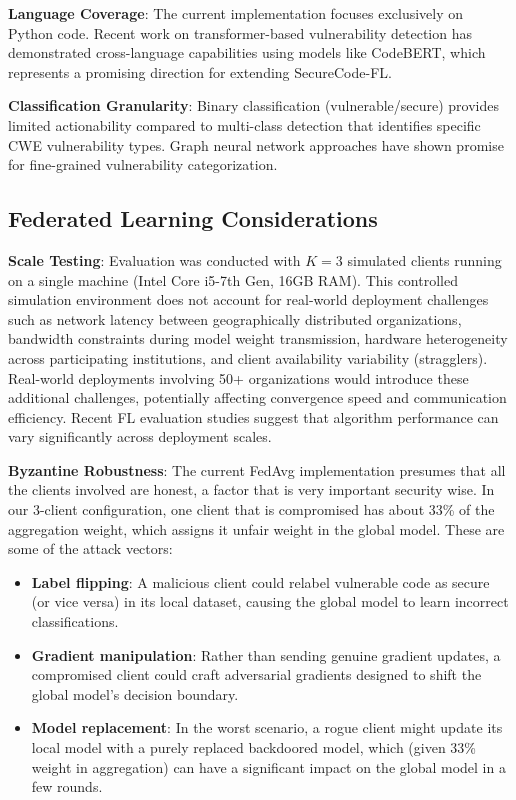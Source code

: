 \documentclass[pdflatex,sn-mathphys-num]{sn-jnl}
\theoremstyle{thmstyleone}%
\theoremstyle{thmstyletwo}%
\theoremstyle{thmstylethree}%
\begin{document}
\textbf{Language Coverage}: The current implementation focuses exclusively on Python code. Recent work on transformer-based vulnerability detection \cite{chen2024vulcodebert, wang2024xtransformer} has demonstrated cross-language capabilities using models like CodeBERT, which represents a promising direction for extending SecureCode-FL.

\textbf{Classification Granularity}: Binary classification (vulnerable/secure) provides limited actionability compared to multi-class detection that identifies specific CWE vulnerability types. Graph neural network approaches \cite{wang2025gnnvuln} have shown promise for fine-grained vulnerability categorization.

\subsection{Federated Learning Considerations}\label{subsec:fl_limitations}

\textbf{Scale Testing}: Evaluation was conducted with $K=3$ simulated clients running on a single machine (Intel Core i5-7th Gen, 16GB RAM). This controlled simulation environment does not account for real-world deployment challenges such as network latency between geographically distributed organizations, bandwidth constraints during model weight transmission, hardware heterogeneity across participating institutions, and client availability variability (stragglers). Real-world deployments involving 50+ organizations would introduce these additional challenges, potentially affecting convergence speed and communication efficiency. Recent FL evaluation studies \cite{liu2024fleval} suggest that algorithm performance can vary significantly across deployment scales.

\textbf{Byzantine Robustness}: The current FedAvg implementation presumes that all the clients involved are honest, a factor that is very important security wise. In our 3-client configuration, one client that is compromised has about 33\% of the aggregation weight, which assigns it unfair weight in the global model. These are some of the attack vectors:

\begin{itemize}
    \item \textbf{Label flipping}: A malicious client could relabel vulnerable code as secure (or vice versa) in its local dataset, causing the global model to learn incorrect classifications.
    \item \textbf{Gradient manipulation}: Rather than sending genuine gradient updates, a compromised client could craft adversarial gradients designed to shift the global model's decision boundary.
    \item \textbf{Model replacement}: In the worst scenario, a rogue client might update its local model with a purely replaced backdoored model, which (given 33\% weight in aggregation) can have a significant impact on the global model in a few rounds.
\end{itemize}
\end{document}
